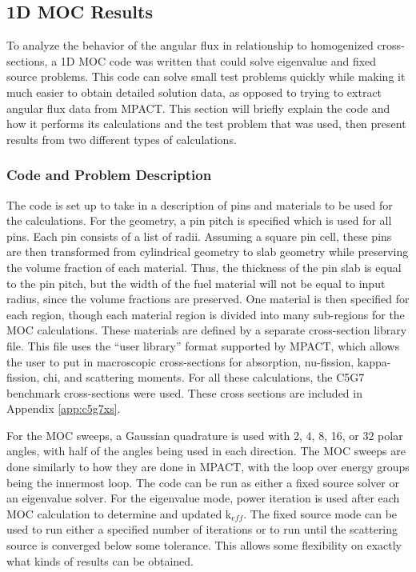 \subsection{1D MOC Results}

To analyze the behavior of the angular flux in relationship to homogenized cross-sections, a 1D MOC code was written that could solve eigenvalue and fixed source problems.  This code can solve small test problems quickly while making it much easier to obtain detailed solution data, as opposed to trying to extract angular flux data from MPACT.  This section will briefly explain the code and how it performs its calculations and the test problem that was used, then present results from two different types of calculations.

\subsubsection{Code and Problem Description}

The code is set up to take in a description of pins and materials to be used for the calculations.  For the geometry, a pin pitch is specified which is used for all pins.  Each pin consists of a list of radii.  Assuming a square pin cell, these pins are then transformed from cylindrical geometry to slab geometry while preserving the volume fraction of each material.  Thus, the thickness of the pin slab is equal to the pin pitch, but the width of the fuel material will not be equal to input radius, since the volume fractions are preserved.  One material is then specified for each region, though each material region is divided into many sub-regions for the MOC calculations.  These materials are defined by a separate cross-section library file.  This file uses the ``user library'' format supported by MPACT, which allows the user to put in macroscopic cross-sections for absorption, nu-fission, kappa-fission, chi, and scattering moments.  For all these calculations, the C5G7 benchmark cross-sections \cite{EELewisC5G72003,EELewisC5G7extended2005} were used.  These cross sections are included in Appendix \ref{app:c5g7xs}.

For the MOC sweeps, a Gaussian quadrature \cite{HandbookOfMathFunctions1972} is used with 2, 4, 8, 16, or 32 polar angles, with half of the angles being used in each direction.  The MOC sweeps are done similarly to how they are done in MPACT, with the loop over energy groups being the innermost loop.  The code can be run as either a fixed source solver or an eigenvalue solver.  For the eigenvalue mode, power iteration is used after each MOC calculation to determine and updated k$_{eff}$.  The fixed source mode can be used to run either a specified number of iterations or to run until the scattering source is converged below some tolerance.  This allows some flexibility on exactly what kinds of results can be obtained.

